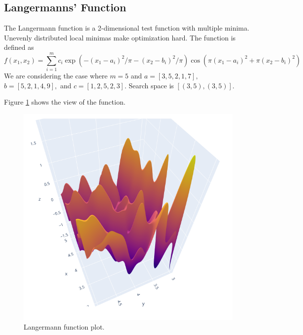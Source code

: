 \subsection{Langermanns' Function}
The Langermann function is a 2-dimensional test function with multiple minima. Unevenly distributed local minimas make optimization hard.
The function is defined as $$ f(x_1,x_2) = \sum_{i=1}^{m}c_i \exp(-(x_1-a_i)^2 / \pi - (x_2 - b_i)^2 / \pi) \cos(\pi (x_1-a_i)^2 + \pi (x_2 - b_i)^2) $$
We are considering the case where $m=5$ and $a=[3, 5, 2, 1, 7],$ $b = [5, 2, 1, 4, 9],$ and $c = [1, 2, 5, 2, 3]$. Search space is $[(3, 5), (3, 5)]$.

Figure \ref{fig:langermann-function-plot} shows the view of the function.
\begin{figure}[H]
	\centering
	\includegraphics[scale=0.4]{figures/langermann-function-plot.png}
	\caption{Langermann function plot.}
	\label{fig:langermann-function-plot}
\end{figure}

